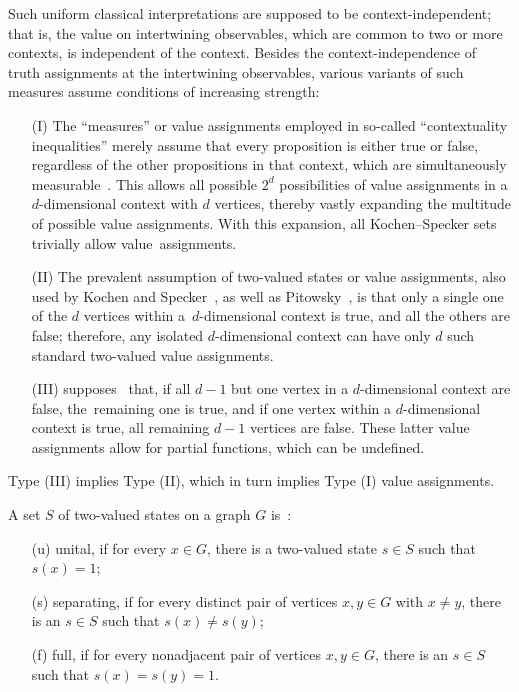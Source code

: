 Such uniform classical interpretations are supposed to be context-independent;
that is, the value on intertwining observables, which are common to two or more contexts, is independent
of the context.
Besides the context-independence of truth assignments at the intertwining observables, various variants of such measures assume conditions of increasing strength:
\begin{itemize}[leftmargin=21pt,labelsep=7pt]
\item[(I)] The ``measures'' or value assignments employed in so-called ``contextuality inequalities''
merely assume that every proposition is either true or false,
regardless of the other propositions in that context, which are simultaneously measurable~\cite{cabello:210401}.
This allows all possible $2^d$ possibilities of value assignments in a $d$-dimensional context with $d$ vertices,
thereby vastly expanding the multitude of possible value assignments.
With this expansion, all Kochen--Specker sets trivially allow value~assignments.
\item[(II)] The prevalent assumption of two-valued states or value assignments, also used by Kochen and Specker~\cite{Kochen1}, as well as Pitowsky~\cite{pitowsky:218},
is that only a {single} one of the $d$ vertices within a~$d$-dimensional context
is true, and all the others are false; therefore, any isolated $d$-dimensional context can have only $d$ such standard two-valued value assignments.
\item[(III)]  supposes~\cite{2012-incomput-proofsCJ,PhysRevA.89.032109,2015-AnalyticKS} that,
if all $d-1$ but one vertex in a $d$-dimensional context are false, the~remaining one is true,
and if one vertex within a $d$-dimensional context is true, all remaining $d-1$ vertices are false.
These latter value assignments allow for {partial} functions, which can be undefined.
\end{itemize}

Type (III) implies
Type (II), which in turn implies Type (I) value assignments.

A set $S$ of two-valued states on a graph $G$ is~\cite{svozil-tkadlec,tkadlec-96}:
\begin{itemize}[leftmargin=21pt,labelsep=7pt]
\item[(u)] {unital}, if for every $x\in G$, there is a two-valued state $s\in S$
such that $s(x) = 1$;
\item[(s)] {separating}, if for every distinct pair of vertices $x,y\in G$
with $x\neq y$, there is an $s\in S$ such that $s (x) \neq s (y)$;
\item[(f)] {full}, if for every nonadjacent pair of vertices $x,y\in G$,
there is an $s \in S$ such that $s (x) = s (y) = 1$.
\end{itemize} %

